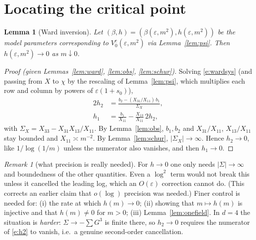 \documentclass[11pt]{article}
\newtheorem{lemma}[theorem]{Lemma}
\theoremstyle{definition}
\theoremstyle{remark}
\newtheorem{remark}[theorem]{Remark}
\newcommand{\eps}{\varepsilon}
\begin{document}
\section{Locating the critical point}

\begin{lemma}[Ward inversion]\label{lem:wardinv}
  Let $(\beta,h)=(\beta(\eps,m^2),h(\eps,m^2))$ be the model parameters corresponding to
  $V_0^c(\eps,m^2)$ via Lemma~\ref{lem:psi}. Then $h(\eps,m^2)\to0$ as $m\downarrow0$.
\end{lemma}
\begin{proof}[Proof (given Lemmas~\ref{lem:ward}, \ref{lem:obs}, \ref{lem:schur})]
Solving \eqref{e:wardsys} (and passing from $X$ to $\chi$ by the rescaling of
Lemma~\ref{lem:psi}, which multiplies each row and column by powers of $\eps(1+s_0)$),
\begin{align}
  2h_2&=\frac{b_2-(X_{31}/X_{11})\,b_1}{\Sigma_X},\label{e:h2}\\
  h_1&=\frac{b_1}{X_{11}}-\frac{X_{13}}{X_{11}}\,2h_2,\label{e:h1}
\end{align}
with $\Sigma_X=X_{33}-X_{31}X_{13}/X_{11}$. By Lemma~\ref{lem:obs}, $b_1,b_2$ and
$X_{31}/X_{11}$, $X_{13}/X_{11}$ stay bounded and $X_{11}\asymp m^{-2}$. By
Lemma~\ref{lem:schur}, $|\Sigma_X|\to\infty$. Hence $h_2\to0$, like $1/\log(1/m)$ unless
the numerator also vanishes, and then $h_1\to0$.
\end{proof}

\begin{remark}[what precision is really needed]
  For $h\to0$ one only needs $|\Sigma|\to\infty$ and boundedness of the other quantities. Even
  a $\log^2$ term would not break this unless it cancelled the leading log, which an
  $O(\eps)$ correction cannot do. (This corrects an earlier claim that $o(\log)$ precision
  was needed.) Finer control is needed for: (i) the rate at which $h(m)\to0$; (ii) showing that
  $m\mapsto h(m)$ is injective and that $h(m)\neq0$ for $m>0$; (iii) Lemma~\ref{lem:onefield}.
  In $d=4$ the situation is \emph{harder}: $\Sigma\to-\sum G^3$ is finite there, so
  $h_2\to0$ requires the numerator of \eqref{e:h2} to vanish, i.e.\ a genuine second-order
  cancellation.
\end{remark}
\end{document}
